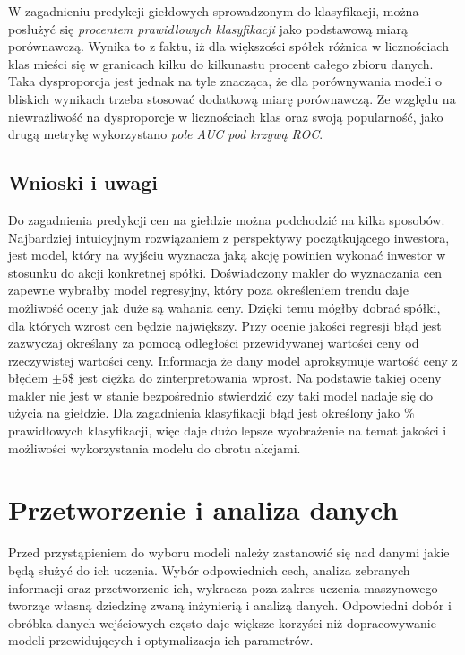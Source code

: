 \documentclass[a4paper, twoside, 11pt, openright]{article}
\begin{document}
\bigskip

W zagadnieniu predykcji giełdowych sprowadzonym do klasyfikacji, można posłużyć się \textit{procentem prawidłowych klasyfikacji} jako podstawową miarą porównawczą. Wynika to z faktu, iż dla większości spółek różnica w licznościach klas mieści się w granicach kilku do kilkunastu procent całego zbioru danych. Taka dysproporcja jest jednak na tyle znacząca, że dla porównywania modeli o bliskich wynikach trzeba stosować dodatkową miarę porównawczą. Ze względu na niewrażliwość na dysproporcje w licznościach klas oraz swoją popularność, jako drugą metrykę wykorzystano \textit{pole AUC pod krzywą ROC}.

\subsection{Wnioski i uwagi}

Do zagadnienia predykcji cen na giełdzie można podchodzić na kilka sposobów. Najbardziej intuicyjnym rozwiązaniem z perspektywy początkującego inwestora, jest model, który na wyjściu wyznacza jaką akcję powinien wykonać inwestor w stosunku do akcji konkretnej spółki. Doświadczony makler do wyznaczania cen zapewne wybrałby model regresyjny, który poza określeniem trendu daje możliwość oceny jak duże są wahania ceny. Dzięki temu mógłby dobrać spółki, dla których wzrost cen będzie największy. Przy ocenie jakości regresji błąd jest zazwyczaj określany za pomocą odległości przewidywanej wartości ceny od rzeczywistej wartości ceny. Informacja że dany model aproksymuje wartość ceny z błędem $\pm 5 \$$ jest ciężka do zinterpretowania wprost. Na podstawie takiej oceny makler nie jest w stanie bezpośrednio stwierdzić czy taki model nadaje się do użycia na giełdzie. Dla zagadnienia klasyfikacji błąd jest określony jako $\%$ prawidłowych klasyfikacji, więc daje dużo lepsze wyobrażenie na temat jakości i możliwości wykorzystania modelu do obrotu akcjami.

\bigskip



\newpage

\section{Przetworzenie i analiza danych}

Przed przystąpieniem do wyboru modeli należy zastanowić się nad danymi jakie będą służyć do ich uczenia. Wybór odpowiednich cech, analiza zebranych informacji oraz przetworzenie ich, wykracza poza zakres uczenia maszynowego tworząc własną dziedzinę zwaną inżynierią i analizą danych. Odpowiedni dobór i obróbka danych wejściowych często daje większe korzyści niż dopracowywanie modeli przewidujących i optymalizacja ich parametrów. 
\end{document}
